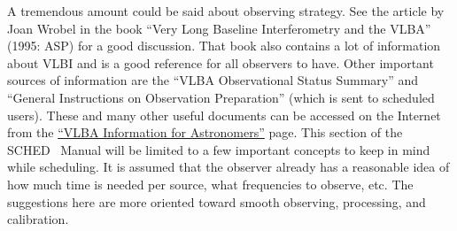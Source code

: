 \documentclass{report}
\newcommand{\schedb}{{\sc SCHED~}}
\begin{document}
A tremendous amount could be said about observing strategy.  See the
article by Joan Wrobel in the book ``Very Long Baseline Interferometry
and the VLBA'' (1995: ASP) for a good discussion.  That book also
contains a lot of information about VLBI and is a good reference for
all observers to have.  Other important sources of information are the
``VLBA Observational Status Summary'' and ``General Instructions on
Observation Preparation'' (which is sent to scheduled users).  These
and many other useful documents can be accessed on the Internet from
the 
{\href{http://www.vlba.nrao.edu/astro}{``VLBA Information for Astronomers''}}
page.  This section of the \schedb
Manual will be limited to a few important concepts to keep in mind
while scheduling.  It is assumed that the observer already has a
reasonable idea of how much time is needed per source, what
frequencies to observe, etc.  The suggestions here are more oriented
toward smooth observing, processing, and calibration.
\end{document}
